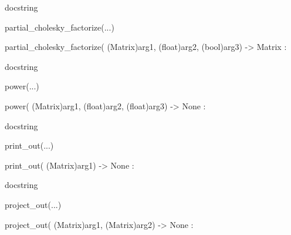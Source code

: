 \documentclass[letterpaper,10pt,english]{sphinxmanual}
\begin{document}
\begin{description}
\begin{description}
\begin{DUlineblock}{0em}
\begin{DUlineblock}{\DUlineblockindent}
\begin{DUlineblock}{\DUlineblockindent}
\item[] docstring
\item[] 
\end{DUlineblock}
\end{DUlineblock}
\item[] partial\_cholesky\_factorize(...)
\item[]
\begin{DUlineblock}{\DUlineblockindent}
\item[] partial\_cholesky\_factorize( (Matrix)arg1, (float)arg2, (bool)arg3) -\textgreater{} Matrix :
\item[]
\begin{DUlineblock}{\DUlineblockindent}
\item[] docstring
\item[] 
\end{DUlineblock}
\end{DUlineblock}
\item[] power(...)
\item[]
\begin{DUlineblock}{\DUlineblockindent}
\item[] power( (Matrix)arg1, (float)arg2, (float)arg3) -\textgreater{} None :
\item[]
\begin{DUlineblock}{\DUlineblockindent}
\item[] docstring
\item[] 
\end{DUlineblock}
\end{DUlineblock}
\item[] print\_out(...)
\item[]
\begin{DUlineblock}{\DUlineblockindent}
\item[] print\_out( (Matrix)arg1) -\textgreater{} None :
\item[]
\begin{DUlineblock}{\DUlineblockindent}
\item[] docstring
\item[] 
\end{DUlineblock}
\end{DUlineblock}
\item[] project\_out(...)
\item[]
\begin{DUlineblock}{\DUlineblockindent}
\item[] project\_out( (Matrix)arg1, (Matrix)arg2) -\textgreater{} None :
\item[]
\begin{DUlineblock}{\DUlineblockindent}

\end{DUlineblock}
\end{DUlineblock}
\end{DUlineblock}
\end{description}
\end{description}
\end{document}

